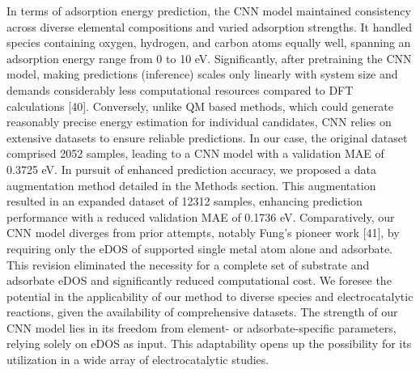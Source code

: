 In terms of adsorption energy prediction, the CNN model maintained consistency across diverse elemental compositions and varied adsorption strengths. It handled species containing oxygen, hydrogen, and carbon atoms equally well, spanning an adsorption energy range from 0 to 10 eV. Significantly, after pretraining the CNN model, making predictions (inference) scales only linearly with system size and demands considerably less computational resources compared to DFT calculations [40]. Conversely, unlike QM based methods, which could generate reasonably precise energy estimation for individual candidates, CNN relies on extensive datasets to ensure reliable predictions. In our case, the original dataset comprised 2052 samples, leading to a CNN model with a validation MAE of 0.3725 eV. In pursuit of enhanced prediction accuracy, we proposed a data augmentation method detailed in the Methods section. This augmentation resulted in an expanded dataset of 12312 samples, enhancing prediction performance with a reduced validation MAE of 0.1736 eV. Comparatively, our CNN model diverges from prior attempts, notably Fung's pioneer work [41], by requiring only the eDOS of supported single metal atom alone and adsorbate. This revision eliminated the necessity for a complete set of substrate and adsorbate eDOS and significantly reduced computational cost. We foresee the potential in the applicability of our method to diverse species and electrocatalytic reactions, given the availability of comprehensive datasets. The strength of our CNN model lies in its freedom from element- or adsorbate-specific parameters, relying solely on eDOS as input. This adaptability opens up the possibility for its utilization in a wide array of electrocatalytic studies.
